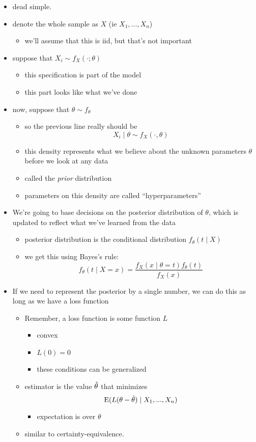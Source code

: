 \begin{itemize}[leftmargin=0pt]
\item dead simple.
\item denote the whole sample as $X$ (ie $X_1,...,X_n$)
\begin{itemize}
\item we'll assume that this is iid, but that's not important
\end{itemize}
\item suppose that $X_i \sim f_X(\cdot; \theta)$
\begin{itemize}
\item this specification is part of the model
\item this part looks like what we've done
\end{itemize}
\item now, suppose that $\theta \sim f_\theta$
\begin{itemize}
\item so the previous line really should be
  \[X_i \mid \theta \sim f_X(\cdot, \theta)\]
\item this density represents what we believe about the unknown
  parameters $\theta$ before we look at any data
\item called the \emph{prior} distribution
\item parameters on this density are called ``hyperparameters''
\end{itemize}
\item We're going to base decisions on the posterior distribution of
  $\theta$, which is updated to reflect what we've learned from the data
\begin{itemize}
\item posterior distribution is the conditional distribution
  $f_\theta(t \mid X)$
\item we get this using Bayes's rule:
  \[f_\theta(t \mid X = x) = \frac{f_X(x \mid \theta = t) f_\theta(t)}{f_X(x)}\]
\end{itemize}
\item If we need to represent the posterior by a single number, we
       can do this as long as we have a loss function
\begin{itemize}
\item Remember, a loss function is some function $L$
\begin{itemize}
\item convex
\item $L(0) = 0$
\item these conditions can be generalized
\end{itemize}
\item estimator is the value $\hat{\theta}$ that minimizes
  \[ \operatorname{E}(L(\theta - \hat{\theta}) \mid X_1,...,X_n) \]
\begin{itemize}
\item expectation is over $\theta$
\end{itemize}
\item similar to certainty-equivalence.
\end{itemize}
\end{itemize}

